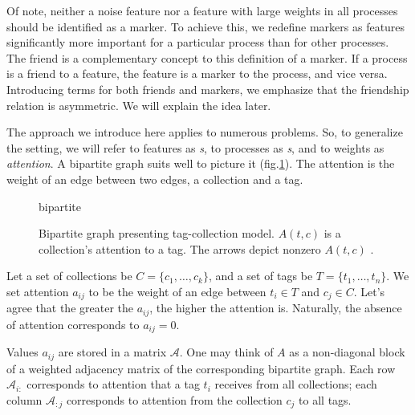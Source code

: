 \documentclass{llncs}
\begin{document}
Of note, neither a noise feature nor a feature with large weights in all processes should be identified as a marker. To achieve this, we redefine markers as features significantly more important for a particular process than for other processes. The friend is a complementary concept to this definition of a marker. If a process is a friend to a feature, the feature is a marker to the process, and vice versa. 
Introducing terms for both friends and markers, we emphasize that the friendship relation is asymmetric. We will explain the idea later.

\textcolor{navyblue}{The approach we introduce here applies to numerous problems. So, to generalize the setting, we will refer to features as \textit{{\tag}s}, to processes as \textit{{\collection}s}, and to weights as \textit{attention}. A bipartite graph suits well to picture it (fig.\ref{fig:nice_name}).  The attention is the weight of an edge between two edges, a collection and a tag.}


\begin{figure}
    \centering
    {bipartite}
    \caption{Bipartite graph presenting tag-collection model. $A(t,c)$ is a collection's attention to a tag. The arrows depict nonzero $A(t,c)$ .}
    \label{fig:nice_name}
\end{figure}

Let a set of collections be $C = \{c_1, \dots, c_k\}$, and a set of tags be $T = \{t_1, \dots, t_n\}$.
We set attention $a_{ij}$ to be the weight of an edge between $t_i \in T$ and $c_j \in C$.
Let's agree that the greater the $a_{ij}$, the higher the attention is. Naturally, the absence of attention corresponds to $a_{ij} = 0$. 

Values $a_{ij}$ are stored in a matrix $\mathcal{A}$. One may think of $A$ as a non-diagonal block of a weighted adjacency matrix of the corresponding bipartite graph. Each row $\mathcal{A}_{i:}$ corresponds to attention that a tag $t_i$ receives from all collections; each column $\mathcal{A}_{:j}$ corresponds to attention from the collection $c_j$ to all tags.
\end{document}
